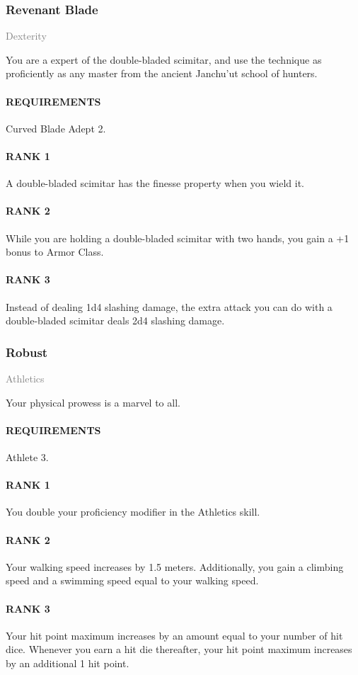 \subsubsection{Revenant Blade} \label{feat::revenantblade}
\small{\textcolor{gray}{Dexterity}}

\normalsize
You are a expert of the double-bladed scimitar, and use the technique as proficiently as any master from the ancient Janchu'ut school of hunters.
\paragraph{REQUIREMENTS} Curved Blade Adept 2.
\paragraph{RANK 1} A double-bladed scimitar has the finesse property when you wield it.
\paragraph{RANK 2} While you are holding a double-bladed scimitar with two hands, you gain a +1 bonus to Armor Class.
\paragraph{RANK 3} Instead of dealing 1d4 slashing damage, the extra attack you can do with a double-bladed scimitar deals 2d4 slashing damage.

\subsubsection{Robust} \label{feat::robust}
\small \textcolor{gray}{Athletics}

\normalsize
Your physical prowess is a marvel to all.
\paragraph{REQUIREMENTS} Athlete 3.
\paragraph{RANK 1} You double your proficiency modifier in the Athletics skill.
\paragraph{RANK 2} Your walking speed increases by 1.5 meters.
Additionally, you gain a climbing speed and a swimming speed equal to your walking speed.
\paragraph{RANK 3} Your hit point maximum increases by an amount equal to your number of hit dice.
Whenever you earn a hit die thereafter, your hit point maximum increases by an additional 1 hit point.

